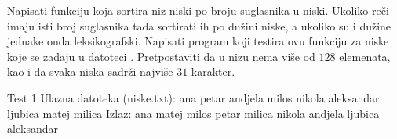 \begin{Exercise}[label=511]
  Napisati funkciju koja sortira niz niski po broju suglasnika u
  niski. Ukoliko reči imaju isti broj suglasnika tada sortirati ih po dužini niske,
  a ukoliko su i dužine jednake onda leksikografski. Napisati program
  koji testira ovu funkciju za niske koje se zadaju u datoteci
  .  Pretpostaviti da u nizu nema više od $128$
  elemenata, kao i da svaka niska sadrži najviše $31$ karakter.
  
\begin{maxitest}
\begin{test}{Test 1}
Ulazna datoteka (niske.txt):
  ana petar andjela milos nikola aleksandar ljubica matej milica
Izlaz:
  ana matej milos petar milica nikola andjela ljubica aleksandar
\end{test}
\end{maxitest}
  
\end{Exercise}

